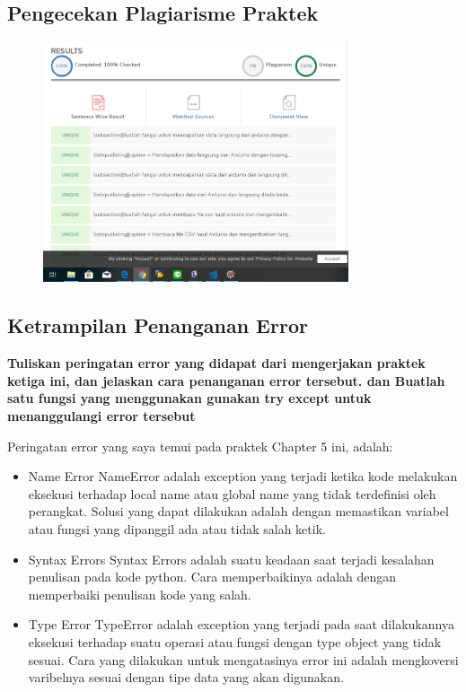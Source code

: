 \subsection{Pengecekan Plagiarisme Praktek}
\begin{figure}[H]
	\includegraphics[width=9cm]{figures/5/Praktek/1174096/Plagiarismepraktek.png}
	\centering
\end{figure}

\subsection{Ketrampilan Penanganan Error}
\textbf{Tuliskan peringatan error yang didapat dari mengerjakan praktek ketiga ini, dan jelaskan cara penanganan error tersebut. dan Buatlah satu fungsi yang menggunakan gunakan try except untuk menanggulangi error tersebut}

Peringatan error yang saya temui pada praktek Chapter 5 ini, adalah:
\begin{itemize}
	\item Name Error
	NameError adalah exception yang terjadi ketika kode melakukan eksekusi terhadap local name atau global name yang tidak terdefinisi oleh perangkat. Solusi yang dapat dilakukan adalah dengan memastikan variabel atau fungsi yang dipanggil ada atau tidak salah ketik.
	
	\item Syntax Errors
	Syntax Errors adalah suatu keadaan saat  terjadi kesalahan penulisan pada kode python. Cara memperbaikinya adalah dengan memperbaiki penulisan kode yang salah.
	
	\item Type Error
	TypeError adalah exception yang terjadi pada saat dilakukannya eksekusi terhadap suatu operasi atau fungsi dengan type object yang tidak sesuai. Cara yang dilakukan untuk mengatasinya error ini adalah mengkoversi varibelnya sesuai dengan tipe data yang akan digunakan.
\end{itemize}

